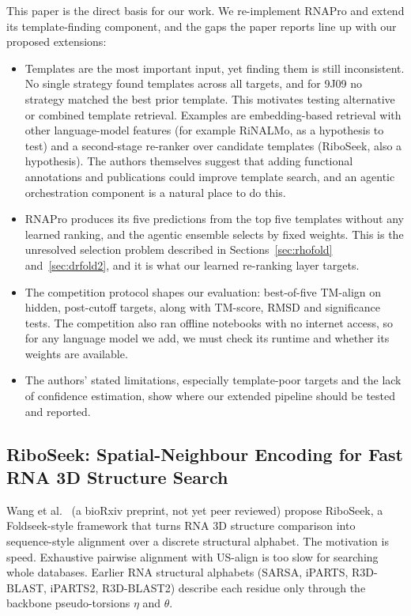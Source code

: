 \documentclass{FastFyp}
\begin{document}
This paper is the direct basis for our work. We re-implement RNAPro and extend its template-finding component, and the gaps the paper reports line up with our proposed extensions:
\begin{itemize}
\item Templates are the most important input, yet finding them is still inconsistent. No single strategy found templates across all targets, and for 9J09 no strategy matched the best prior template. This motivates testing alternative or combined template retrieval. Examples are embedding-based retrieval with other language-model features (for example RiNALMo, as a hypothesis to test) and a second-stage re-ranker over candidate templates (RiboSeek, also a hypothesis). The authors themselves suggest that adding functional annotations and publications could improve template search, and an agentic orchestration component is a natural place to do this.
\item RNAPro produces its five predictions from the top five templates without any learned ranking, and the agentic ensemble selects by fixed weights. This is the unresolved selection problem described in Sections~\ref{sec:rhofold} and~\ref{sec:drfold2}, and it is what our learned re-ranking layer targets.
\item The competition protocol shapes our evaluation: best-of-five TM-align on hidden, post-cutoff targets, along with TM-score, RMSD and significance tests. The competition also ran offline notebooks with no internet access, so for any language model we add, we must check its runtime and whether its weights are available.
\item The authors' stated limitations, especially template-poor targets and the lack of confidence estimation, show where our extended pipeline should be tested and reported.
\end{itemize}

\subsection{RiboSeek: Spatial-Neighbour Encoding for Fast RNA 3D Structure Search}
Wang et al.~\cite{wang2026riboseek} (a bioRxiv preprint, not yet peer reviewed) propose RiboSeek, a Foldseek-style framework that turns RNA 3D structure comparison into sequence-style alignment over a discrete structural alphabet. The motivation is speed. Exhaustive pairwise alignment with US-align is too slow for searching whole databases. Earlier RNA structural alphabets (SARSA, iPARTS, R3D-BLAST, iPARTS2, R3D-BLAST2) describe each residue only through the backbone pseudo-torsions $\eta$ and $\theta$.
\end{document}
